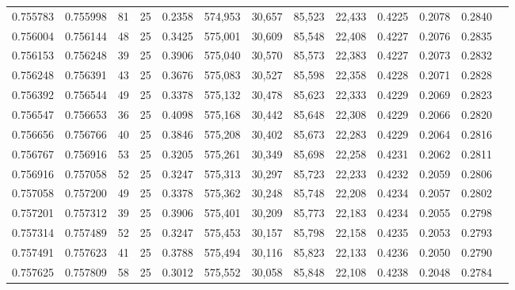 \begin{tabular}{rrrrrrrrrrrrr}
0.755783 & 0.755998 &    81 &  25 &                                     0.2358 & 574,953 &  30,657 &  85,523 &  22,433 & 0.4225 & 0.2078 & 0.2840 \\
0.756004 & 0.756144 &    48 &  25 &                                     0.3425 & 575,001 &  30,609 &  85,548 &  22,408 & 0.4227 & 0.2076 & 0.2835 \\
0.756153 & 0.756248 &    39 &  25 &                                     0.3906 & 575,040 &  30,570 &  85,573 &  22,383 & 0.4227 & 0.2073 & 0.2832 \\
0.756248 & 0.756391 &    43 &  25 &                                     0.3676 & 575,083 &  30,527 &  85,598 &  22,358 & 0.4228 & 0.2071 & 0.2828 \\
0.756392 & 0.756544 &    49 &  25 &                                     0.3378 & 575,132 &  30,478 &  85,623 &  22,333 & 0.4229 & 0.2069 & 0.2823 \\
0.756547 & 0.756653 &    36 &  25 &                                     0.4098 & 575,168 &  30,442 &  85,648 &  22,308 & 0.4229 & 0.2066 & 0.2820 \\
0.756656 & 0.756766 &    40 &  25 &                                     0.3846 & 575,208 &  30,402 &  85,673 &  22,283 & 0.4229 & 0.2064 & 0.2816 \\
0.756767 & 0.756916 &    53 &  25 &                                     0.3205 & 575,261 &  30,349 &  85,698 &  22,258 & 0.4231 & 0.2062 & 0.2811 \\
0.756916 & 0.757058 &    52 &  25 &                                     0.3247 & 575,313 &  30,297 &  85,723 &  22,233 & 0.4232 & 0.2059 & 0.2806 \\
0.757058 & 0.757200 &    49 &  25 &                                     0.3378 & 575,362 &  30,248 &  85,748 &  22,208 & 0.4234 & 0.2057 & 0.2802 \\
0.757201 & 0.757312 &    39 &  25 &                                     0.3906 & 575,401 &  30,209 &  85,773 &  22,183 & 0.4234 & 0.2055 & 0.2798 \\
0.757314 & 0.757489 &    52 &  25 &                                     0.3247 & 575,453 &  30,157 &  85,798 &  22,158 & 0.4235 & 0.2053 & 0.2793 \\
0.757491 & 0.757623 &    41 &  25 &                                     0.3788 & 575,494 &  30,116 &  85,823 &  22,133 & 0.4236 & 0.2050 & 0.2790 \\
0.757625 & 0.757809 &    58 &  25 &                                     0.3012 & 575,552 &  30,058 &  85,848 &  22,108 & 0.4238 & 0.2048 & 0.2784 \\

\end{tabular}
